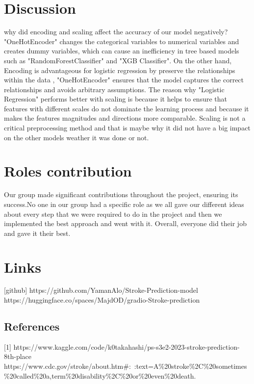 \documentclass{article}
\begin{document}
\section{Discussion}
why did encoding and scaling affect the accuracy of our model negatively? 
\newline "OneHotEncoder" changes the categorical variables to numerical variables and creates dummy variables, which can cause an inefficiency in tree based models such as "RandomForestClassifier" and "XGB Classifier". On the other hand, Encoding is advantageous for logistic regression by preserve the relationships within the data , "OneHotEncoder" ensures that the model captures the correct relationships and avoids arbitrary assumptions.
\newline
The reason why "Logistic Regression" performs better with scaling is because it helps to ensure that features with different scales do not dominate the learning process and because it makes the features magnitudes and directions more comparable. Scaling is not a critical preprocessing method and that is maybe why it did not have a big impact on the other models weather it was done or not.



\section{Roles contribution}
Our group made significant contributions throughout the project, ensuring its success.No one in our group had a specific role as we all gave our different ideas about every step that we were required to do in the project and then we implemented the best approach and went with it. Overall, everyone did their job and gave it their best.

\section{Links}
[github] https://github.com/YamanAlo/Stroke-Prediction-model
\newline
[Deployment] https://huggingface.co/spaces/MajdOD/gradio-Stroke-prediction

\subsection{References}
[1] https://www.kaggle.com/code/k0takahashi/ps-s3e2-2023-stroke-prediction-8th-place
\newline
[2] https://www.cdc.gov/stroke/about.htm#:~:text=A\%20stroke\%2C\%20sometimes\%20called\%20a,term\%20disability\%2C\%20or\%20even\%20death.
\end{document}
